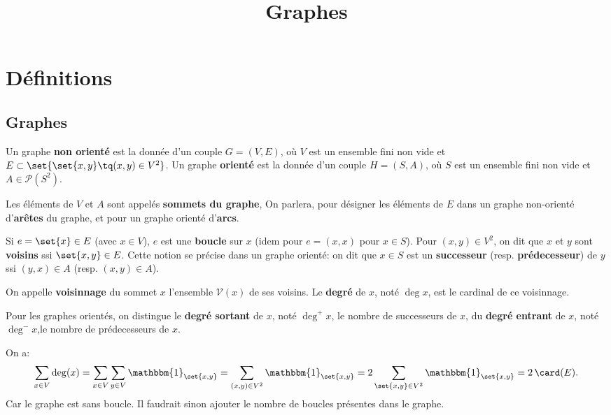 \documentclass{scrartcl}
\title{Graphes}
\author{}
\date{}
\begin{document}
	\maketitle
	\section{Définitions}
		\subsection{Graphes}
			 Un graphe \textbf{non orienté} est la donnée 
			d'un couple $G = (V,E)$,
			où $V$ est un ensemble fini non vide 
			et $E \subset \set{\set{x,y} \tq (x,y) \in V^2}$.
			Un graphe \textbf{orienté} est la donnée d'un couple $H = (S,A)$,
			où $S$ est un ensemble fini non vide et 
			$A \in \mathcal{P}(S^2)$.

			Les éléments de $V$ et $A$ sont appelés \textbf{sommets du graphe}, 
			On parlera, pour désigner les éléments de $E$ dans un graphe non-orienté d'\textbf{arêtes} du graphe,
			et pour un graphe orienté d'\textbf{arcs}.

			Si $e = \set{x} \in E$ (avec $x \in V$), $e$ est une \textbf{boucle} sur $x$
			(idem pour $e = (x,x)$ pour $x \in S$). 
			Pour $(x,y) \in V^2$, on dit que $x$ et $y$ sont \textbf{voisins} ssi $\set{x,y} \in E$.
			Cette notion se précise dans un graphe orienté: 
			on dit que $x \in S$ est un \textbf{successeur} (resp. \textbf{prédecesseur}) de $y$
			ssi $(y,x) \in A$ (resp. $(x,y)\in A$). 
			
			On appelle \textbf{voisinnage} du sommet $x$ l'ensemble $\mathscr{V}(x)$ de ses voisins.
			Le \textbf{degré} de $x$, noté $\deg x$, est le cardinal de ce voisinnage.

			Pour les graphes orientés, on distingue le \textbf{degré sortant} de $x$, noté $\deg^+ x$, le nombre de successeurs de $x$,
			du \textbf{degré entrant} de $x$, noté $\deg^- x$,le nombre de prédecesseurs de $x$.


			\begin{demo}
				\item On a:
				\[
					\sum_{x \in V} \deg(x)= \sum_{x\in V} \sum_{y\in V} \mathbbm{1}_\set{x,y} = \sum_{(x,y) \in V^2} \mathbbm{1}_\set{x,y}
					= 2\sum_{\set{x,y} \in V^2} \mathbbm{1}_\set{x,y} = 2\,\card(E).
				\]
				Car le graphe est sans boucle. Il faudrait sinon ajouter le nombre de boucles présentes dans le graphe.
			\end{demo}
\end{document}
